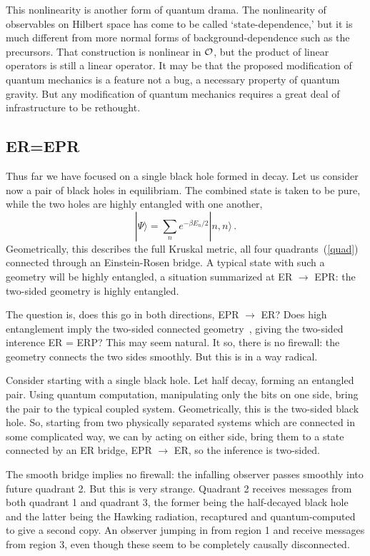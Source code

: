 \documentclass[12pt]{article}
\newcommand{\be}{\begin{equation}}
\newcommand{\ee}{\end{equation}}
\begin{document}
This nonlinearity is another form of quantum drama.  The nonlinearity of observables on Hilbert space has come to be called `state-dependence,' but it is much different from more normal forms of background-dependence such as the precursors. That construction is nonlinear in $\cal O$, but the product of linear operators is still a linear operator.  It may be that the proposed modification of quantum mechanics is a feature not a bug, a necessary property of quantum gravity.  But any modification of quantum mechanics requires a great deal of infrastructure to be rethought. 

\subsection{ER=EPR}

Thus far we have focused on a single black hole formed in decay.  Let us consider now a pair of black holes in equilibriam.  The combined state is taken to be pure, while the two holes are highly entangled with one another,
\be
| \Psi \rangle = \sum_n e^{-\beta E_n/2} |n,n\rangle  \,.
\ee
Geometrically, this describes the full Kruskal metric, all four quadrants~(\ref{quad}) connected through an Einstein-Rosen bridge.  A typical state with such a geometry will be highly entangled, a situation summarized at ER $\rightarrow$ EPR: the two-sided geometry is highly entangled.

The question is, does this go in both directions, EPR $\rightarrow$ ER?  Does high entanglement imply the two-sided connected geometry~\cite{Maldacena:2013xja}, giving the two-sided interence ER = ERP?  This may seem natural.  It so, there is no firewall: the geometry connects the two sides smoothly.  But this is in a way radical.  

Consider starting with a single black hole.  Let half decay, forming an entangled pair.  Using quantum computation, manipulating only the bits on one side, 
bring the pair to the typical coupled system.  Geometrically, this is the two-sided black hole.  So, starting from two physically separated systems which are connected in some complicated way, we can by acting on either side, bring them to a state connected by an ER bridge, EPR $\rightarrow$ ER, so the inference is two-sided.  

The smooth bridge implies no firewall: the infalling observer passes smoothly into future quadrant 2.  But this is very strange.  Quadrant 2 receives messages from both quadrant 1 and quadrant 3, the former being the half-decayed black hole and the latter being the Hawking radiation, recaptured and quantum-computed to give a second copy.  An observer jumping in from region 1 and receive messages from region 3, even though these seem to be completely causally disconnected.
\end{document}
